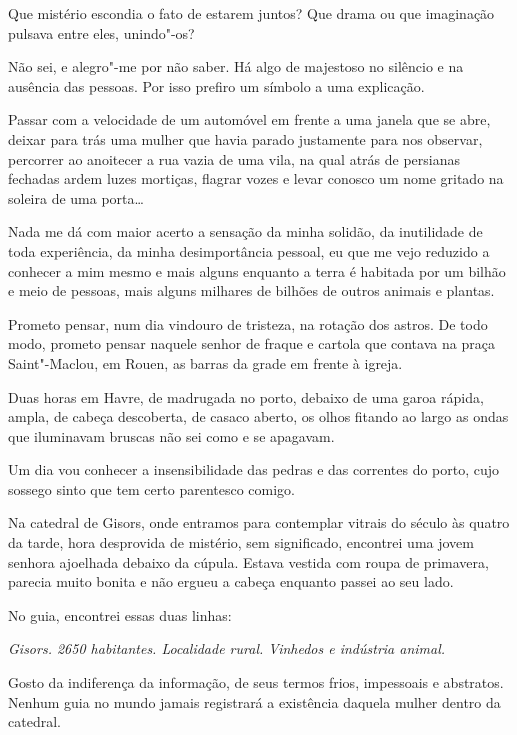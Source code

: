Que mistério escondia o fato de estarem juntos? Que drama ou que
imaginação pulsava entre eles, unindo"-os?

Não sei, e alegro"-me por não saber. Há algo de majestoso no silêncio e
na ausência das pessoas. Por isso prefiro um símbolo a uma explicação.

\asterisc

Passar com a velocidade de um automóvel em frente a uma janela que se
abre, deixar para trás uma mulher que havia parado justamente para nos
observar, percorrer ao anoitecer a rua vazia de uma vila, na qual atrás
de persianas fechadas ardem luzes mortiças, flagrar vozes e levar
conosco um nome gritado na soleira de uma porta\ldots{}

Nada me dá com maior acerto a sensação da minha solidão, da inutilidade
de toda experiência, da minha desimportância pessoal, eu que me vejo
reduzido a conhecer a mim mesmo e mais alguns enquanto a terra é
habitada por um bilhão e meio de pessoas, mais alguns milhares de
bilhões de outros animais e plantas.

Prometo pensar, num dia vindouro de tristeza, na rotação dos astros. De
todo modo, prometo pensar naquele senhor de fraque e cartola que
contava na praça Saint"-Maclou, em Rouen, as barras da grade em frente à
igreja.

\asterisc

Duas horas em Havre, de madrugada no porto, debaixo de uma garoa
rápida, ampla, de cabeça descoberta, de casaco aberto, os olhos fitando
ao largo as ondas que iluminavam bruscas não sei como e se apagavam.

Um dia vou conhecer a insensibilidade das pedras e das correntes do
porto, cujo sossego sinto que tem certo parentesco comigo.

\asterisc

Na catedral de Gisors, onde entramos para contemplar vitrais do
século  às quatro da tarde, hora desprovida de mistério, sem
significado, encontrei uma jovem senhora ajoelhada debaixo da
cúpula. Estava vestida com roupa de primavera, parecia muito bonita e
não ergueu a cabeça enquanto passei ao seu lado.

No guia, encontrei essas duas linhas:

\emph{Gisors. 2650 habitantes. Localidade rural. Vinhedos e indústria
animal.}

Gosto da indiferença da informação, de seus termos frios, impessoais e
abstratos. Nenhum guia no mundo jamais registrará a existência daquela
mulher dentro da catedral.

